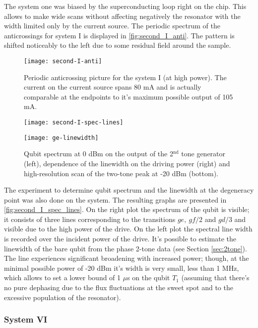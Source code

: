\documentclass[12pt, twoside]{report}
\numberwithin{equation}{section}
\begin{document}
The system one was biased by the superconducting loop right on the chip. This allows to make wide scans without affecting negatively the resonator with the width limited only by the current source. The periodic spectrum of the anticrossings for system I is displayed in \autoref{fig:second_I_anti}. The pattern is shifted noticeably to the left due to some residual field around the sample.

\begin{figure}[h]
\centering
\texttt{[image: second-I-anti]}
\caption{Periodic anticrossing picture for the system I (at high power). The current on the current source spans 80 mA and is actually comparable at the endpoints to it's maximum possible output of 105 mA.}
\label{fig:second_I_anti}
\end{figure}

\begin{figure}[h]
\centering
\texttt{[image: second-I-spec-lines]}

\texttt{[image: ge-linewidth]}
\caption{Qubit spectrum at 0 dBm on the output of the 2$^{\text{nd}}$ tone generator (left), dependence of the linewidth on the driving power (right) and high-resolution scan of the two-tone peak at -20 dBm (bottom).}
\label{fig:second_I_spec_lines}
\end{figure}


The experiment to determine qubit spectrum and the linewidth at the degeneracy point was also done on the system. The resulting graphs are presented in \autoref{fig:second_I_spec_lines}. On the right plot the spectrum of the qubit is visible; it consists of three lines corresponding to the transitions $ge,\ gf/2$ and $gd/3$ and visible due to the high power of the drive. On the left plot the spectral line width is recorded over the incident power of the drive. It's possible to estimate the linewidth of the bare qubit from the phase 2-tone data (see Section \ref{sec:2tone}). The line experiences significant broadening with increased power; though, at the minimal possible power of -20 dBm it's width is very small, less than 1 MHz, which allows to set a lower bound of 1 $\mu$s on the qubit $T_1$ (assuming that there's no pure dephasing due to the flux fluctuations at the sweet spot and to the excessive population of the resonator).

\subsubsection{System VI}
\end{document}
